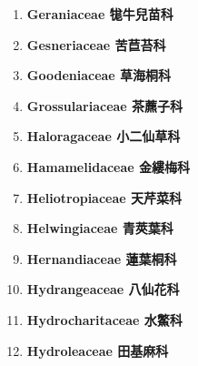 \begin{enumerate}
        
      \item[] \begin{small}\textbf{Geraniaceae 牻牛兒苗科} \end{small}
        
      \item[] \begin{small}\textbf{Gesneriaceae 苦苣苔科} \end{small}
        
      \item[] \begin{small}\textbf{Goodeniaceae 草海桐科} \end{small}
        
      \item[] \begin{small}\textbf{Grossulariaceae 茶藨子科} \end{small}
        
      \item[] \begin{small}\textbf{Haloragaceae 小二仙草科} \end{small}
        
      \item[] \begin{small}\textbf{Hamamelidaceae 金縷梅科} \end{small}
        
      \item[] \begin{small}\textbf{Heliotropiaceae 天芹菜科} \end{small}
        
      \item[] \begin{small}\textbf{Helwingiaceae 青莢葉科} \end{small}
        
      \item[] \begin{small}\textbf{Hernandiaceae 蓮葉桐科} \end{small}
        
      \item[] \begin{small}\textbf{Hydrangeaceae 八仙花科} \end{small}
        
      \item[] \begin{small}\textbf{Hydrocharitaceae 水鱉科} \end{small}
        
      \item[] \begin{small}\textbf{Hydroleaceae 田基麻科} \end{small}

\end{enumerate}
